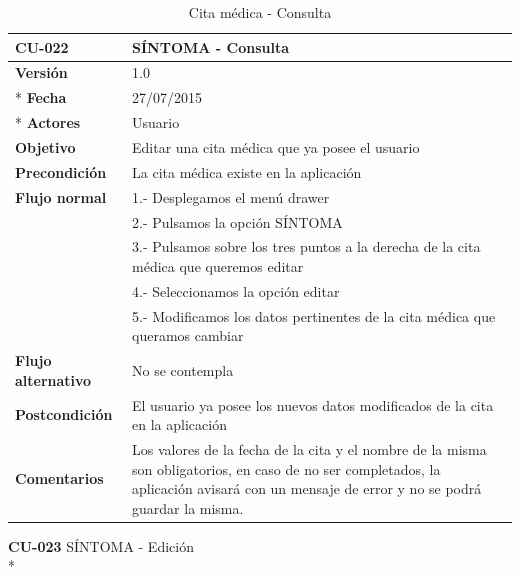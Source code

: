 \documentclass[../pfc.tex]{subfiles}
\begin{document}
		\begin{table}[H]
			\centering
			\begin{tabular}[t]{|p{3cm}|p{9.5cm}|}
				\hline \textbf{CU-022} & \textbf{SÍNTOMA - Consulta} \\*
				\hline\hline \textbf{Versión} & 1.0 \\ *
				\hline\hline \textbf{Fecha} & 27/07/2015 \\ *
				\hline\textbf{Actores} 	& Usuario\\*
				\hline \textbf{Objetivo} & Editar una cita médica que ya posee el usuario\\* 			
				\hline \textbf{Precondición} & La cita médica existe en la aplicación\\* 
				\hline \textbf{Flujo normal} & 1.- Desplegamos el menú drawer \\* 
				& 2.- Pulsamos la opción SÍNTOMA\\*	
				& 3.- Pulsamos sobre los tres puntos a la derecha de la cita médica que queremos editar\\*	
				& 4.- Seleccionamos la opción editar\\*	
				& 5.- Modificamos los datos pertinentes de la cita médica que queramos cambiar\\*	
				\hline \textbf{Flujo alternativo} & No se contempla \\* 
				\hline \textbf{Postcondición} & El usuario ya posee los nuevos datos modificados de la cita en la aplicación \\* 
				\hline \textbf{Comentarios}   & Los valores de la fecha de la cita y el nombre de la misma son obligatorios, en caso de no ser completados, la aplicación avisará con un mensaje de error y no se podrá guardar la misma.\\*
				\hline
			\end{tabular}
			\caption{Cita médica - Consulta}
			\label{tabla:caso022}
		\end{table}
		
		
		
		
		\textbf{CU-023}	SÍNTOMA - Edición\\*
		
\end{document}
